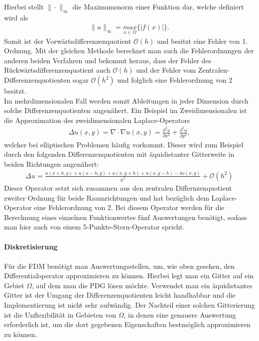 \documentclass[12pt,titlepage]{article}
\begin{document}
Hierbei stellt $\|\cdot\|_{\infty}$ die Maximumsnorm einer Funktion dar, welche definiert wird als
\begin{align}
 \|u\|_{\infty}=\underset{x\in\Omega}{max}\{|f(x)|\}.\nonumber
\end{align}
Somit ist der Vorwärtsdifferenzenquotient $\mathcal{O}(h)$ und besitzt eine Fehler von 1. Ordnung. Mit der gleichen Methode berechnet man auch die Fehlerordnungen der anderen beiden Verfahren und bekommt heraus, dass der Fehler des Rückwärtsdifferenzenquotient auch $\mathcal{O}(h)$ und der Fehler vom Zentralen-Differenzenquotienten sogar $\mathcal{O}(h^2)$ und folglich eine Fehlerordnung von 2 besitzt.\\
Im mehrdimensionalen Fall werden somit Ableitungen in jeder Dimension durch solche Differenzenquotienten angenähert. Ein Beispiel im Zweidimensionalen ist die Approximation des zweidimensionalen Laplace-Operators
\begin{align}
 \Delta u(x,y)=\nabla\cdot\nabla u(x,y)=\frac{\partial^2u}{\partial x^2}+\frac{\partial^2u}{\partial y^2},
\end{align}
welcher bei elliptischen Problemen häufig vorkommt. Dieser wird zum Beispiel durch den folgenden Differenzenquotienten mit äquidistanter Gitterweite in beiden Richtungen angenähert:
 \small
\begin{align}
 \Delta u=\frac{u(x+h,y)+u(x-h,y)+u(x,y+h)+u(x,y-h)-4u(x,y)}{h^2}+\mathcal{O}(h^2)\nonumber
\end{align}
\normalsize
Dieser Operator setzt sich zusammen aus den zentralen Differnzenquotient zweiter Ordnung für beide Raumrichtungen und hat bezüglich dem Laplace-Operator eine Fehlerordnung von 2. Bei diesem Operator werden für die Berechnung eines einzelnen Funktionwertes fünf Auswertungen benötigt, sodass man hier auch von einem 5-Punkte-Stern-Operator spricht.\\\\
\textbf{Diskretisierung}\\\\
Für die FDM benötigt man Auswertungsstellen, um, wie oben gesehen, den Differentialoperator approximieren zu können. Hierbei legt man ein Gitter auf ein Gebiet $\Omega$, auf dem man die PDG lösen möchte. Verwendet man ein äquidistantes Gitter ist der Umgang der Differenzenquotienten leicht handhabbar und die Implementierung ist nicht sehr aufwändig. Der Nachteil einer solchen Gitterierung ist die Unflexibilität in Gebieten von $\Omega$, in denen eine genauere Auswertung erforderlich ist, um die dort gegebenen Eigenschaften bestmöglich approximieren zu können.\\
\end{document}
